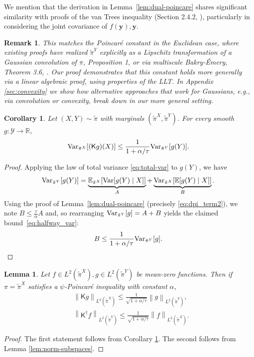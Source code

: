 \documentclass[11pt]{article}
\newtheorem{lemma}{Lemma}
\newtheorem{corollary}{Corollary}
\newtheorem{remark}{Remark}
\newcommand{\norm}[1]{\left\lVert#1\right\rVert}
\newcommand{\R}{\mathbb{R}}
\newcommand{\E}{\mathbb{E}}
\newcommand{\Var}{\textup{Var}}
\newcommand{\0}{\mathbf{0}}
\newcommand{\1}{\mathbf{1}}
\newcommand{\vy}{\mathbf{y}}
\newcommand{\calY}{\mathcal{Y}}
\newcommand{\sfK}{\mathsf{K}}
\newcommand{\tpi}{\tilde{\pi}}
\begin{document}
We mention that the derivation in Lemma~\ref{lem:dual-poincare} shares significant similarity with proofs of the van Trees inequality (Section 2.4.2, \cite{van2004detection}), particularly in considering the joint covariance of $f(\vy), \vy$.

\begin{remark}
    This matches the Poincar\'e constant in the Euclidean case, where existing proofs have realized $\tpi^Y$ explicitly as a Lipschitz transformation of a Gaussian convolution of $\pi$, Proposition 1, \cite{ShiTZ25} or via multiscale Bakry-\'Emery, Theorem 3.6, \cite{BauerschmidtBD24}.   Our proof demonstrates that this constant holds more generally via a linear algebraic proof, using properties of the LLT.  In Appendix \ref{sec:convexity} we show how alternative approaches that work for Gaussians, e.g., via convolution or convexity, break down in our more general setting.
\end{remark}

\begin{corollary}\label{cor:halfway_var}
    Let $(X,Y)\sim \tpi$ with marginals $(\tpi^X, \tpi^Y)$. For every smooth $g:\calY\to\R$, \begin{equation}\label{eq:halfway_var}
        \Var_{\tpi^X}[(\sfK g)(X)]\le \frac{1}{1+\alpha/\tau}\Var_{\tpi^Y}[g(Y)].
    \end{equation}
    
\end{corollary}
\begin{proof}
    Applying the law of total variance \eqref{eq:total-var} to $g(Y)$, we have 
    \[
        \Var_{\tpi^Y}[g(Y)] = \underbrace{\E_{\tpi^X}[\Var[g(Y)\mid X]]}_A +\underbrace{ \Var_{\tpi^X}[\E[g(Y)\mid X]]}_B.
    \]
Using the proof of Lemma~\ref{lem:dual-poincare} (precisely \eqref{eq:dpi_term2}), we note $B\le \frac{\tau}{\alpha}A$ and, so rearranging $\Var_{\tpi^Y}[g] = A + B$ yields the claimed bound~\eqref{eq:halfway_var}:
\[
B\le \frac{1}{1+\alpha/\tau}\Var_{\tpi^Y}[g].
\]
\end{proof}

\begin{lemma}\label{lem:norm-bounds}
    Let $f\in L^2(\tpi^X), g\in L^2(\tpi^Y)$ be mean-zero functions.  Then if $\pi=\tpi^X$ satisfies a $\psi$-Poincar\'e inequality with constant $\alpha$,
    \begin{align*}
        & \norm{\sfK g}_{L^2(\tpi^X)}\leq \frac{1}{\sqrt{1+\alpha/\tau}}\norm{g}_{L^2(\tpi^Y)},\\
        & \norm{\sfK^\dagger f}_{L^2(\tpi^Y)}\leq \frac{1}{\sqrt{1+\alpha/\tau}}\norm{f}_{L^2(\tpi^X)}.
    \end{align*}
\end{lemma}
\begin{proof}
    The first statement follows from Corollary \ref{cor:halfway_var}.  The second follows from Lemma \ref{lem:norm-subspaces}.
\end{proof}
\end{document}
